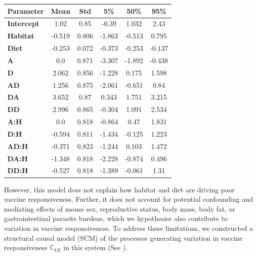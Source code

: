 \documentclass[a4paper, hidelinks, 11pt]{article}
\begin{document}
\begin{table}[htbp]
	\sffamily
	\begin{tabular}{|>{\bfseries}l|ccccc|}
		\hline
		Parameter & \textbf{Mean} & \textbf{Std} & \textbf{5\%} & \textbf{50\%} & \textbf{95\%} \\
		\hline
		Intercept & 1.02          & 0.85         & -0.39        & 1.032         & 2.43          \\
		Habitat   & -0.519        & 0.806        & -1.863       & -0.513        & 0.795         \\
		Diet      & -0.253        & 0.072        & -0.373       & -0.253        & -0.137        \\
		A         & 0.0           & 0.871        & -3.307       & -1.892        & -0.438        \\
		D         & 2.062         & 0.856        & -1.228       & 0.175         & 1.598         \\
		AD        & 1.256         & 0.875        & -2.061       & -0.651        & 0.84          \\
		DA        & 3.652         & 0.87         & 0.343        & 1.751         & 3.215         \\
		DD        & 2.996         & 0.865        & -0.304       & 1.091         & 2.534         \\
		A:H       & 0.0           & 0.818        & -0.864       & 0.47          & 1.831         \\
		D:H       & -0.594        & 0.811        & -1.434       & -0.125        & 1.223         \\
		AD:H      & -0.371        & 0.823        & -1.244       & 0.103         & 1.472         \\
		DA:H      & -1.348        & 0.818        & -2.228       & -0.874        & 0.496         \\
		DD:H      & -0.527        & 0.818        & -1.389       & -0.061        & 1.31          \\
		\hline
	\end{tabular}
	\label{tbl:precis}
\end{table}

However, this model does not explain how habitat and diet are driving poor vaccine responsiveness. Further, it does not account for potential confounding and mediating effects of mouse sex, reproductive status, body mass, body fat, or gastrointestinal parasite burdens, which we hypothesise also contribute to variation in vaccine responsiveness. To address these limitations, we constructed a structural causal model (SCM) of the processes generating variation in vaccine responsiveness $\mathbb{C}_{VE}$ in this system (See ).
\end{document}
